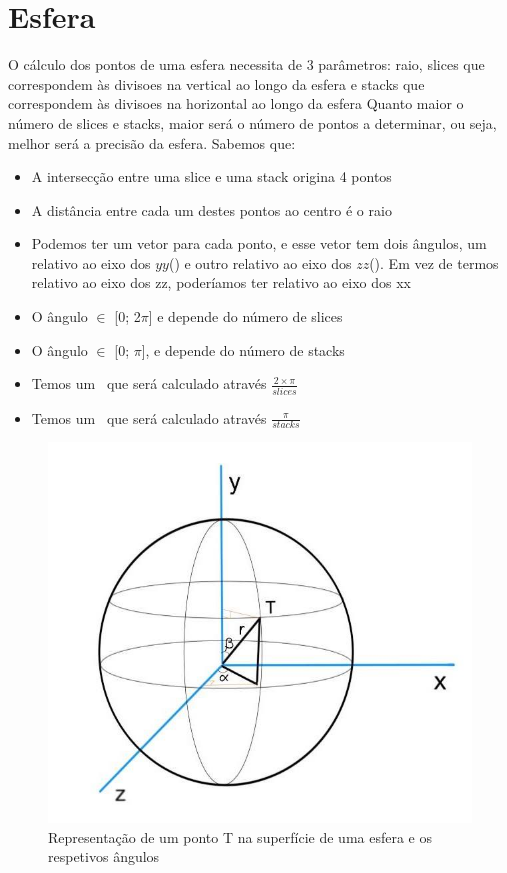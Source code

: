 \documentclass{article}
\begin{document}
\section{Esfera}
O cálculo dos pontos de uma esfera necessita de 3 parâmetros: raio, slices que correspondem às divisoes na vertical ao longo da esfera e stacks que correspondem às divisoes na horizontal ao longo da esfera
Quanto maior o número de slices e stacks, maior será o número de pontos a determinar, ou seja, melhor será a precisão da esfera. Sabemos que:
\begin{itemize}
\item A intersecção entre uma slice e uma stack origina 4 pontos
\item A distância entre cada um destes pontos ao centro é o raio
\item Podemos ter um vetor para cada ponto, e esse vetor tem dois ângulos, um relativo ao eixo dos $yy$(\textbeta) e outro relativo ao eixo dos $zz$(\textalpha). Em vez de termos relativo ao eixo dos zz, poderíamos ter relativo ao eixo dos xx
\item O ângulo \textalpha $\in$ [0; 2$\pi$] e depende do número de slices
\item O ângulo \textbeta $\in$ [0; $\pi$], e depende do número de stacks
\item Temos um \textDelta\textalpha \ que será calculado através $\frac{2\times\pi}{slices}$
\item Temos um \textDelta\textbeta \ que será calculado através $\frac{\pi}{stacks}$
\end{itemize}
\begin{figure}[H]
\centering\includegraphics[scale=0.50]{esfera} 
\caption{\label{fig:controller}Representação de um ponto T na superfície de uma esfera e os respetivos ângulos}
\end{figure}
\end{document}
